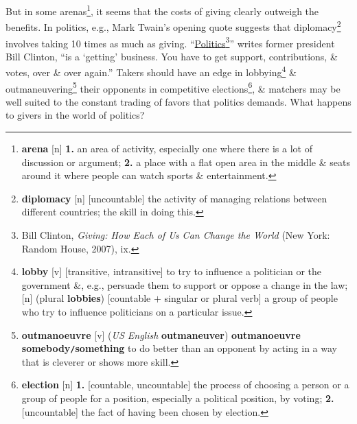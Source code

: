 \documentclass[oneside]{book}
\numberwithin{equation}{section}
\begin{document}
But in some arenas\footnote{\textbf{arena} [n] \textbf{1.} an area of activity, especially one where there is a lot of discussion or argument; \textbf{2.} a place with a flat open area in the middle \& seats around it where people can watch sports \& entertainment.}, it seems that the costs of giving clearly outweigh the benefits. In politics, e.g., Mark Twain's opening quote suggests that diplomacy\footnote{\textbf{diplomacy} [n] [uncountable] the activity of managing relations between different countries; the skill in doing this.} involves taking 10 times as much as giving. ``\underline{Politics}\footnote{Bill Clinton, \textit{Giving: How Each of Us Can Change the World} (New York: Random House, 2007), ix.}'' writes former president Bill Clinton, ``is a `getting' business. You have to get support, contributions, \& votes, over \& over again.'' Takers should have an edge in lobbying\footnote{\textbf{lobby} [v] [transitive, intransitive] to try to influence a politician or the government \&, e.g., persuade them to support or oppose a change in the law; [n] (plural \textbf{lobbies}) [countable $+$ singular or plural verb] a group of people who try to influence politicians on a particular issue.} \& outmaneuvering\footnote{\textbf{outmanoeuvre} [v] (\textit{US English} \textbf{outmaneuver}) \textbf{outmanoeuvre somebody\texttt{/}something} to do better than an opponent by acting in a way that is cleverer or shows more skill.} their opponents in competitive elections\footnote{\textbf{election} [n] \textbf{1.} [countable, uncountable] the process of choosing a person or a group of people for a position, especially a political position, by voting; \textbf{2.} [uncountable] the fact of having been chosen by election.}, \& matchers may be well suited to the constant trading of favors that politics demands. What happens to givers in the world of politics?
\end{document}
